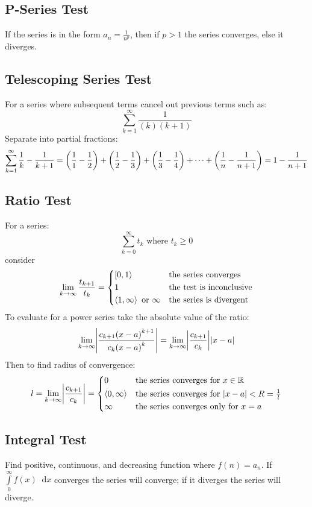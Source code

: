 \documentclass[12pt]{article}
\DeclarePairedDelimiter\abs{\lvert}{\rvert}
\DeclarePairedDelimiter\paren{(}{)}
\newcommand*{\D}[1]{\mathop{}\!\mathrm{d}#1}
\newcommand*{\isum}[1]{\sum\limits_{#1}^\infty}
\begin{document}
\subsection*{P-Series Test}
If the series is in the form \(a_n = \frac{1}{n^p}\), then if \(p > 1\) the
series converges, else it diverges.
\subsection*{Telescoping Series Test}
For a series where subsequent terms cancel out previous terms such as:
\[
  \isum{k=1} \frac{1}{(k)(k+1)}
\]
Separate into partial fractions:
\[
  \isum{k=1} \frac{1}{k}-\frac{1}{k+1} = \paren*{\frac{1}{1} - \frac{1}{2}} +
  \paren*{\frac{1}{2} - \frac{1}{3}} + \paren*{\frac{1}{3} - \frac{1}{4}}
  + \cdots + \paren*{\frac{1}{n} - \frac{1}{n+1}}
  = 1 - \frac{1}{n+1}
\]
\subsection*{Ratio Test}
For a series:
\[
  \isum{k=0} t_k \text{ where } t_k \ge 0
\]
consider
\[
  \lim_{k \to \infty} \frac{t_{k+1}}{t_k} = \begin{dcases*}
    \left[0,1\right> & the series converges\\
    1 & the test is inconclusive\\
    \left<1,\infty\right> \text{ or } \infty  & the series is divergent
  \end{dcases*}
\]
To evaluate for a power series take the absolute value of the ratio:
\[
  \lim_{k \to \infty} \abs*{\frac{c_{k+1}{(x-a)}^{k+1}}{c_k{(x-a)}^k}}
  = \lim_{k \to \infty} \abs*{\frac{c_{k+1}}{c_k}}\abs*{x-a}
\]
Then to find radius of convergence:
\[
  l = \lim_{k \to \infty} \abs*{\frac{c_{k+1}}{c_k}} = \begin{dcases*}
    0 & the series converges for \(x \in \mathbb{R}\)\\
    \left<0,\infty\right> & the series converges for
      \(\abs*{x-a} < R = \tfrac{1}{l}\)\\
    \infty & the series converges only for \(x=a\)
  \end{dcases*}
\]
\subsection*{Integral Test}
Find positive, continuous, and decreasing function where \(f(n) = a_n\). If
\(\int\limits_0^\infty f(x) \D{x}\) converges the series will converge; if it
diverges the series will diverge.
\section*{}
\end{document}
